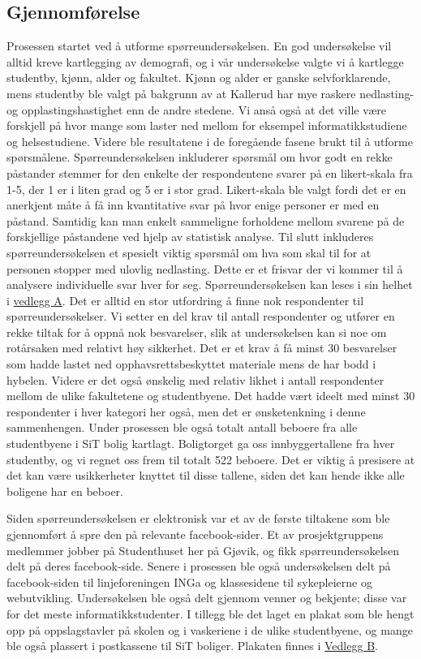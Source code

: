 \subsection{Gjennomførelse}
Prosessen startet ved å utforme spørreundersøkelsen. En god undersøkelse vil alltid kreve kartlegging av demografi, og i vår undersøkelse valgte vi å kartlegge studentby, kjønn, alder og fakultet. Kjønn og alder er ganske selvforklarende, mens studentby ble valgt på bakgrunn av at Kallerud har mye raskere nedlasting- og opplastingshastighet enn de andre stedene. Vi anså også at det ville være forskjell på hvor mange som laster ned mellom for eksempel informatikkstudiene og helsestudiene. Videre ble resultatene i de foregående fasene brukt til å utforme spørsmålene. Spørreundersøkelsen inkluderer spørsmål om hvor godt en rekke påstander stemmer for den enkelte der respondentene svarer på en likert-skala fra 1-5, der 1 er i liten grad og 5 er i stor grad. Likert-skala ble valgt fordi det er en anerkjent måte å få inn kvantitative svar på hvor enige personer er med en påstand. Samtidig kan man enkelt sammeligne forholdene mellom svarene på de forskjellige påstandene ved hjelp av statistisk analyse. Til slutt inkluderes spørreundersøkelsen et spesielt viktig spørsmål om hva som skal til for at personen stopper med ulovlig nedlasting. Dette er et frisvar der vi kommer til å analysere individuelle svar hver for seg. Spørreundersøkelsen kan leses i sin helhet i \hyperref[undersokelse]{vedlegg A}.
\newline
Det er alltid en stor utfordring å finne nok respondenter til spørreundersøkelser. Vi setter en del krav til antall respondenter og utfører en rekke tiltak for å oppnå nok besvarelser, slik at undersøkelsen kan si noe om rotårsaken med relativt høy sikkerhet. Det er et krav å få minst 30 besvarelser som hadde lastet ned opphavsrettsbeskyttet materiale mens de har bodd i hybelen. Videre er det også ønskelig med relativ likhet i antall respondenter mellom de ulike fakultetene og studentbyene. Det hadde vært ideelt med minst 30 respondenter i hver kategori her også, men det er ønsketenkning i denne sammenhengen. Under prosessen ble også totalt antall beboere fra alle studentbyene i SiT bolig kartlagt. Boligtorget ga oss innbyggertallene fra hver studentby, og vi regnet oss frem til totalt 522 beboere. Det er viktig å presisere at det kan være usikkerheter knyttet til disse tallene, siden det kan hende ikke alle boligene har en beboer.

Siden spørreundersøkelsen er elektronisk var et av de første tiltakene som ble gjennomført å spre den på relevante facebook-sider. Et av prosjektgruppens medlemmer jobber på Studenthuset her på Gjøvik, og fikk spørreundersøkelsen delt på deres facebook-side. Senere i prosessen ble også undersøkelsen delt på facebook-siden til linjeforeningen INGa og klassesidene til sykepleierne og webutvikling. Undersøkelsen ble også delt gjennom venner og bekjente; disse var for det meste informatikkstudenter. I tillegg ble det laget en plakat som ble hengt opp på oppslagstavler på skolen og i vaskeriene i de ulike studentbyene, og mange ble også plassert i postkassene til SiT boliger. Plakaten finnes i \hyperref[plakat]{Vedlegg B}. 

